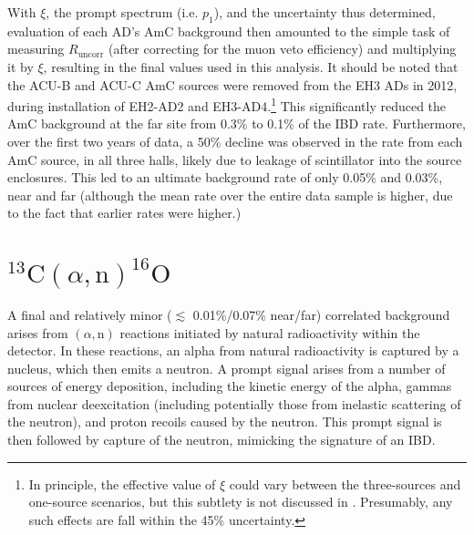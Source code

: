 \documentclass[../thesis.tex]{subfiles}
\begin{document}
With $\xi$, the prompt spectrum (i.e. $p_1$), and the uncertainty thus
determined, evaluation of each AD's AmC background then amounted to the simple
task of measuring $R_{\mathrm{uncorr}}$ (after correcting for the muon veto
efficiency) and multiplying it by $\xi$, resulting in the final values used in
this analysis. It should be noted that the ACU-B and ACU-C AmC sources were
removed from the EH3 ADs in 2012, during installation of EH2-AD2 and
EH3-AD4.\footnote{In principle, the effective value of $\xi$ could vary between
  the three-sources and one-source scenarios, but this subtlety is not discussed
  in \cite{Gu_2015}. Presumably, any such effects are fall within the 45\%
  uncertainty.} This significantly reduced the AmC background at the far site
from 0.3\% to 0.1\% of the IBD rate. Furthermore, over the first two years of
data, a 50\% decline was observed in the rate from each AmC source, in all three
halls, likely due to leakage of scintillator into the source enclosures. This
led to an ultimate background rate of only 0.05\% and 0.03\%, near and far
(although the mean rate over the entire data sample is higher, due to the fact
that earlier rates were higher.)

\newcommand\alphN{(\alpha,\mathrm{n})} \newcommand\CanO{^{13}\mathrm{C}(\alpha,
  \mathrm{n})^{16}\mathrm{O}}

\section{$\CanO$}

A final and relatively minor ($\lesssim$ 0.01\%/0.07\% near/far) correlated
background arises from $\alphN$ reactions initiated by natural radioactivity
within the detector. In these reactions, an alpha from natural radioactivity is
captured by a nucleus, which then emits a neutron. A prompt signal arises from a
number of sources of energy deposition, including the kinetic energy of the
alpha, gammas from nuclear deexcitation (including potentially those from
inelastic scattering of the neutron), and proton recoils caused by the
neutron. This prompt signal is then followed by capture of the neutron,
mimicking the signature of an IBD.
\end{document}
